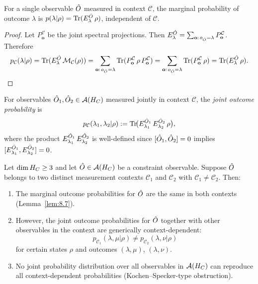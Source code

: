 \begin{lemma}
\label{lem:8.7}
For a single observable $\hat{O}$ measured in context $\mathcal{C}$,
the marginal probability of outcome $\lambda$ is
$p(\lambda | \rho) = \mathrm{Tr}(E^{\hat{O}}_\lambda\,\rho)$,
independent of $\mathcal{C}$.
\end{lemma}

\begin{proof}
Let $P_\mathbf{o}^{\mathcal{C}}$ be the joint spectral projections.
Then $E^{\hat{O}}_\lambda = \sum_{\mathbf{o}:\,o_{\hat{O}} = \lambda}
P_\mathbf{o}^{\mathcal{C}}$.  Therefore
\[
  p_\mathcal{C}(\lambda|\rho)
  = \mathrm{Tr}(E^{\hat{O}}_\lambda\,\mathcal{M}_\mathcal{C}(\rho))
  = \sum_{\mathbf{o}:\,o_{\hat{O}}=\lambda}
    \mathrm{Tr}(P_\mathbf{o}^{\mathcal{C}}\,\rho\,P_\mathbf{o}^{\mathcal{C}})
  = \sum_{\mathbf{o}:\,o_{\hat{O}}=\lambda}
    \mathrm{Tr}(P_\mathbf{o}^{\mathcal{C}}\,\rho)
  = \mathrm{Tr}(E^{\hat{O}}_\lambda\,\rho).
\]
\end{proof}

\begin{definition}
\label{def:8.16}
For observables $\hat{O}_1, \hat{O}_2 \in \mathcal{A}(H_C)$ measured jointly in
context $\mathcal{C}$, the \emph{joint outcome probability} is
\[
  p_{\mathcal{C}}(\lambda_1, \lambda_2 | \rho)
  := \mathrm{Tr}\!\bigl(
    E^{\hat{O}_1}_{\lambda_1}\,E^{\hat{O}_2}_{\lambda_2}\,\rho
  \bigr),
\]
where the product $E^{\hat{O}_1}_{\lambda_1}\,E^{\hat{O}_2}_{\lambda_2}$
is well-defined since $[\hat{O}_1, \hat{O}_2] = 0$ implies
$[E^{\hat{O}_1}_{\lambda_1}, E^{\hat{O}_2}_{\lambda_2}] = 0$.
\end{definition}

\begin{theorem}
\label{thm:8.7}
Let $\dim H_C \geq 3$ and let $\hat{O} \in \mathcal{A}(H_C)$ be a constraint
observable.  Suppose $\hat{O}$ belongs to two distinct measurement
contexts $\mathcal{C}_1$ and $\mathcal{C}_2$ with
$\mathcal{C}_1 \neq \mathcal{C}_2$.  Then:
\begin{enumerate}
  \item[\textup{(i)}] The marginal outcome probabilities for $\hat{O}$
    are the same in both contexts
    \textup{(}Lemma~\textup{\ref{lem:8.7})}.
  \item[\textup{(ii)}] However, the joint outcome probabilities for
    $\hat{O}$ together with other observables in the context are
    generically context-dependent:
    \[
      p_{\mathcal{C}_1}(\lambda, \mu | \rho)
      \neq p_{\mathcal{C}_2}(\lambda, \nu | \rho)
    \]
    for certain states $\rho$ and outcomes $(\lambda, \mu)$,
    $(\lambda, \nu)$.
  \item[\textup{(iii)}] No joint probability distribution over all
    observables in $\mathcal{A}(H_C)$ can reproduce all context-dependent
    probabilities \textup{(}Kochen--Specker-type obstruction\textup{)}.
\end{enumerate}
\end{theorem}

